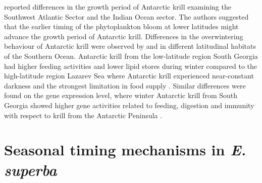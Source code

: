 \citet{kawaguchi_fishing_2006} reported differences in the growth period of Antarctic
krill examining the Southwest Atlantic Sector and the Indian Ocean sector. The
authors suggested that the earlier timing of the phytoplankton bloom at lower
latitudes might advance the growth period of Antarctic krill. Differences in
the overwintering behaviour of Antarctic krill were observed by \citet{schmidt_feeding_2014} and \citet{seear_seasonal_2012} in different latitudinal habitats of the
Southern Ocean. Antarctic krill from the low-latitude region South Georgia had
higher feeding activities and lower lipid stores during winter compared to the
high-latitude region Lazarev Sea where Antarctic krill experienced
near-constant darkness and the strongest limitation in food supply \citep{schmidt_feeding_2014}. Similar differences were found on the gene expression level, where
winter Antarctic krill from South Georgia showed higher gene activities related
to feeding, digestion and immunity with respect to krill from the Antarctic
Peninsula \citep{seear_seasonal_2012}.

\section{Seasonal timing mechanisms in \textit{E. superba}}

